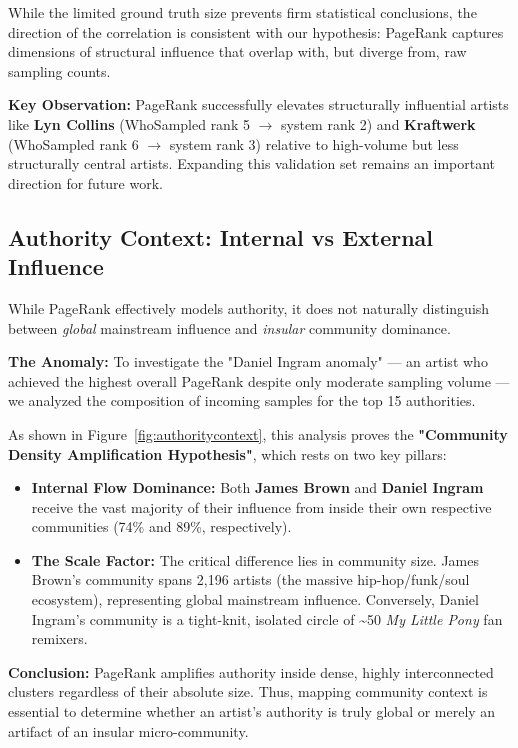 \documentclass[a4paper, 12pt]{article}
\begin{document}
While the limited ground truth size prevents firm statistical conclusions, the direction of the correlation is consistent with our hypothesis: PageRank captures dimensions of structural influence that overlap with, but diverge from, raw sampling counts. 

\textbf{Key Observation:} PageRank successfully elevates structurally influential artists like \textbf{Lyn Collins} (WhoSampled rank 5 $\to$ system rank 2) and \textbf{Kraftwerk} (WhoSampled rank 6 $\to$ system rank 3) relative to high-volume but less structurally central artists. Expanding this validation set remains an important direction for future work.

\subsection{Authority Context: Internal vs External Influence}
While PageRank effectively models authority, it does not naturally distinguish between \textit{global} mainstream influence and \textit{insular} community dominance. 

\textbf{The Anomaly:} To investigate the "Daniel Ingram anomaly" — an artist who achieved the highest overall PageRank despite only moderate sampling volume — we analyzed the composition of incoming samples for the top 15 authorities.

As shown in Figure~\ref{fig:authoritycontext}, this analysis proves the \textbf{"Community Density Amplification Hypothesis"}, which rests on two key pillars:

\begin{itemize}
    \item \textbf{Internal Flow Dominance:} Both \textbf{James Brown} and \textbf{Daniel Ingram} receive the vast majority of their influence from inside their own respective communities (74\% and 89\%, respectively).
    \item \textbf{The Scale Factor:} The critical difference lies in community size. James Brown's community spans 2,196 artists (the massive hip-hop/funk/soul ecosystem), representing global mainstream influence. Conversely, Daniel Ingram's community is a tight-knit, isolated circle of \textasciitilde50 \textit{My Little Pony} fan remixers.
\end{itemize}

\textbf{Conclusion:} PageRank amplifies authority inside dense, highly interconnected clusters regardless of their absolute size. Thus, mapping community context is essential to determine whether an artist's authority is truly global or merely an artifact of an insular micro-community.
\end{document}
